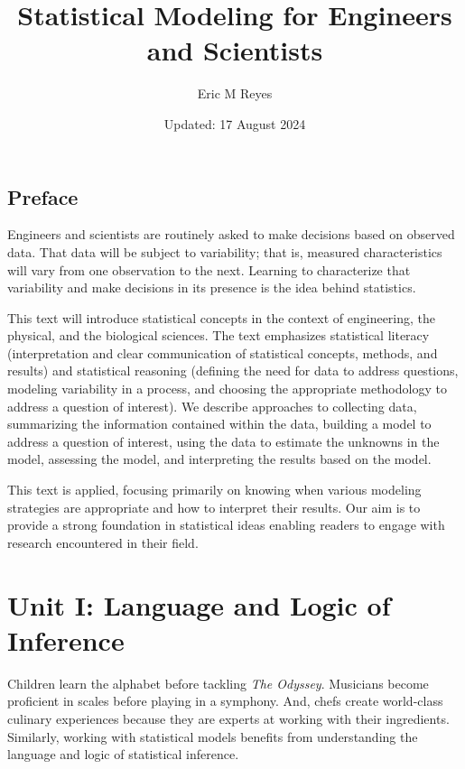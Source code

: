 \documentclass[
  letterpaper,
  DIV=11,
  numbers=noendperiod]{scrreprt}
\title{Statistical Modeling for Engineers and Scientists}
\author{Eric M Reyes}
\date{Updated: 17 August 2024}
\renewcommand*\contentsname{Table of contents}
\newcommand\contentsname{Table of contents}
\theoremstyle{plain}
\theoremstyle{definition}
\theoremstyle{definition}
\theoremstyle{remark}
\begin{document}
\maketitle

\renewcommand*\contentsname{Table of contents}
{
\hypersetup{linkcolor=}
\setcounter{tocdepth}{2}
\tableofcontents
}

\chapter*{Preface}\label{preface}


Engineers and scientists are routinely asked to make decisions based on
observed data. That data will be subject to variability; that is,
measured characteristics will vary from one observation to the next.
Learning to characterize that variability and make decisions in its
presence is the idea behind statistics.

This text will introduce statistical concepts in the context of
engineering, the physical, and the biological sciences. The text
emphasizes statistical literacy (interpretation and clear communication
of statistical concepts, methods, and results) and statistical reasoning
(defining the need for data to address questions, modeling variability
in a process, and choosing the appropriate methodology to address a
question of interest). We describe approaches to collecting data,
summarizing the information contained within the data, building a model
to address a question of interest, using the data to estimate the
unknowns in the model, assessing the model, and interpreting the results
based on the model.

This text is applied, focusing primarily on knowing when various
modeling strategies are appropriate and how to interpret their results.
Our aim is to provide a strong foundation in statistical ideas enabling
readers to engage with research encountered in their field.

\part{Unit I: Language and Logic of Inference}

Children learn the alphabet before tackling \emph{The Odyssey}.
Musicians become proficient in scales before playing in a symphony. And,
chefs create world-class culinary experiences because they are experts
at working with their ingredients. Similarly, working with statistical
models benefits from understanding the language and logic of statistical
inference.
\end{document}
